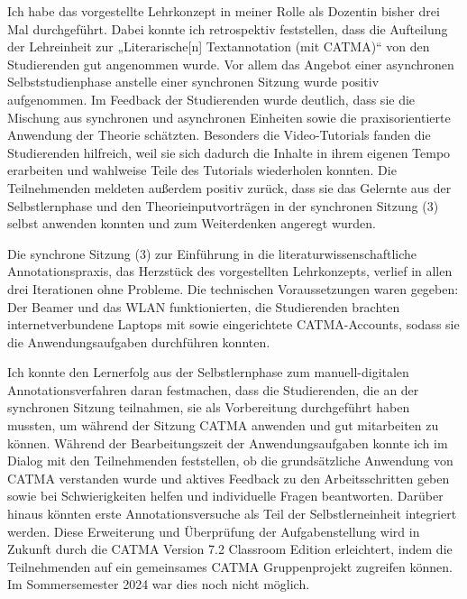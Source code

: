 \documentclass[
          a4paper,
        ]{article}
\begin{document}
Ich habe das vorgestellte Lehrkonzept in meiner Rolle als Dozentin
bisher drei Mal durchgeführt. Dabei konnte ich retrospektiv feststellen,
dass die Aufteilung der Lehreinheit zur „Literarische{[}n{]}
Textannotation (mit CATMA)`` von den Studierenden gut angenommen wurde.
Vor allem das Angebot einer asynchronen Selbststudienphase anstelle
einer synchronen Sitzung wurde positiv aufgenommen. Im Feedback der
Studierenden wurde deutlich, dass sie die Mischung aus synchronen und
asynchronen Einheiten sowie die praxisorientierte Anwendung der Theorie
schätzten. Besonders die Video-Tutorials fanden die Studierenden
hilfreich, weil sie sich dadurch die Inhalte in ihrem eigenen Tempo
erarbeiten und wahlweise Teile des Tutorials wiederholen konnten. Die
Teilnehmenden meldeten außerdem positiv zurück, dass sie das Gelernte
aus der Selbstlernphase und den Theorieinputvorträgen in der synchronen
Sitzung (3) selbst anwenden konnten und zum Weiterdenken angeregt
wurden.

Die synchrone Sitzung (3) zur Einführung in die
literaturwissenschaftliche Annotationspraxis, das Herzstück des
vorgestellten Lehrkonzepts, verlief in allen drei Iterationen ohne
Probleme. Die technischen Voraussetzungen waren gegeben: Der Beamer und
das WLAN funktionierten, die Studierenden brachten internetverbundene
Laptops mit sowie eingerichtete CATMA-Accounts, sodass sie die
Anwendungsaufgaben durchführen konnten.

Ich konnte den Lernerfolg aus der Selbstlernphase zum manuell-digitalen
Annotationsverfahren daran festmachen, dass die Studierenden, die an der
synchronen Sitzung teilnahmen, sie als Vorbereitung durchgeführt haben
mussten, um während der Sitzung CATMA anwenden und gut mitarbeiten zu
können. Während der Bearbeitungszeit der Anwendungsaufgaben konnte ich
im Dialog mit den Teilnehmenden feststellen, ob die grundsätzliche
Anwendung von CATMA verstanden wurde und aktives Feedback zu den
Arbeitsschritten geben sowie bei Schwierigkeiten helfen und individuelle
Fragen beantworten. Darüber hinaus könnten erste Annotationsversuche als
Teil der Selbstlerneinheit integriert werden. Diese Erweiterung und
Überprüfung der Aufgabenstellung wird in Zukunft durch die CATMA Version
7.2 Classroom Edition erleichtert, indem die Teilnehmenden auf ein
gemeinsames CATMA Gruppenprojekt zugreifen können. Im Sommersemester
2024 war dies noch nicht möglich.
\end{document}
